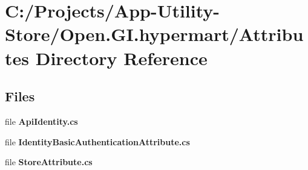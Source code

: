 \section{C\+:/\+Projects/\+App-\/\+Utility-\/\+Store/\+Open.G\+I.\+hypermart/\+Attributes Directory Reference}
\label{dir_9d8f451eb6968954d34bc6160da1ddb0}
\subsection*{Files}
\begin{DoxyCompactItemize}
\item 
file \textbf{ Api\+Identity.\+cs}
\item 
file \textbf{ Identity\+Basic\+Authentication\+Attribute.\+cs}
\item 
file \textbf{ Store\+Attribute.\+cs}
\end{DoxyCompactItemize}
